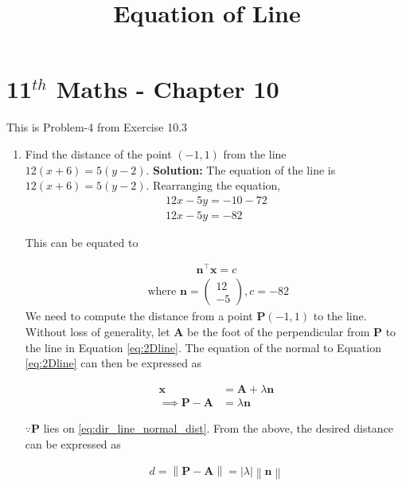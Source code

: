 \documentclass[12pt]{article}
\providecommand{\brak}[1]{\ensuremath{\left(#1\right)}}
\providecommand{\norm}[1]{\left\lVert#1\right\rVert}
\newcommand{\solution}{\noindent \textbf{Solution: }}
\newcommand{\myvec}[1]{\ensuremath{\begin{pmatrix}#1\end{pmatrix}}}
\providecommand{\abs}[1]{\left\vert#1\right\vert}
\let\vec\mathbf
\begin{document}
\begin{center}
\title{\textbf{Equation  of Line}}
\date{\vspace{-5ex}} %
\maketitle
\end{center}
\setcounter{page}{1}

\section{11$^{th}$ Maths - Chapter 10}
This is Problem-4 from Exercise 10.3
\begin{enumerate}
\item Find the distance of the point $(-1,1)$ from the line $12\brak{x+6} = 5\brak{y-2}$. 
\solution 
The equation of the line is $12\brak{x+6} = 5\brak{y-2}$. Rearranging the equation, 
\begin{align}
12x-5y = -10-72 \\
12x-5y = -82
\end{align}

This can be equated to

\begin{align}
	\label{eq:2Dline}
	\vec{n}^\top\vec{x} = c 
\end{align}
\begin{align}
	\text{ where }
		\vec{n} = \myvec{
	  12 \\
	  -5 
	  } ,   c = -82 
\end{align}
We need to compute the distance from a point $\vec{P}(-1,1)$ to the line. 
Without loss of generality, let $\vec{A}$ be the foot of the perpendicular from $\vec{P}$ to the line in Equation \eqref{eq:2Dline}. 
The equation of the normal to Equation \eqref{eq:2Dline} can then be expressed as 

\begin{align}
	\label{eq:dir_line_normal_dist}
	\vec{x} &= \vec{A} + \lambda \vec{n}
	\\
	\implies 
	\label{eq:dir_line_normal_dist_pa}
	\vec{P}- \vec{A} &=  \lambda \vec{n}
\end{align}

$\because \vec{P}$ lies on 
		\eqref{eq:dir_line_normal_dist}.
From the above, the desired distance can be expressed as 

\begin{align}
	\label{eq:dir_line_normal_dist_pa_d}
d = 	\norm{\vec{P}- \vec{A}}= \abs{\lambda} \norm{\vec{n}}
\end{align}


\end{enumerate}
\end{document}
